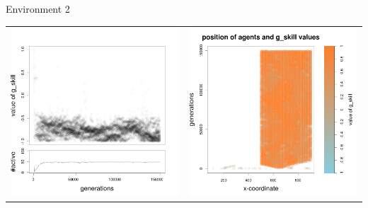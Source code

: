 \documentclass[8pt, handout=show,notes=show]{beamer}
\begin{document}
\begin{frame}{Environment 2}
\begin{table}[H]
\centering
\begin{tabular}{cc}
 \includegraphics[width=\imgSize]{../images/5StaticEnv/Gplot5_staticEnv2}&\includegraphics[width=\imgSize]{../images/5StaticEnv/Gplot5Static_staticEnv2}\\

\end{tabular}
\end{table}
\end{frame}
\end{document}

